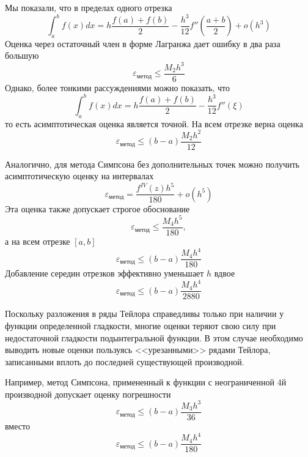 \documentclass[professionalfonts,compress,unicode]{beamer}
\begin{document}
{
	Мы показали, что в пределах одного отрезка 
	$$
	\int_a^b f(x) dx = h\frac{f(a)+f(b)}{2} - \frac{h^3}{12}f''\left(\frac{a+b}{2}\right) + o(h^3)
	$$
	Оценка через остаточный член в форме Лагранжа дает ошибку в два раза большую
	$$
	\varepsilon_{\text{метод}} \leq \frac{M_2 h^3}{6}
	$$
	Однако, более тонкими рассуждениями можно показать, что
	$$
	\int_a^b f(x) dx = h\frac{f(a)+f(b)}{2} - \frac{h^3}{12}f''(\xi)
	$$
	то есть асимптотическая оценка является точной.  На всем отрезке верна оценка
	$$
	\varepsilon_{\text{метод}} \leq (b-a) \frac{M_2 h^2}{12}
	$$	
}

{
	Аналогично, для метода Симпсона без дополнительных точек можно получить 
	асимптотическую оценку на интервалах
	$$
	\varepsilon_{\text{метод}} = \frac{f^{IV}(z) h^5}{180} + o(h^5)
	$$
	Эта оценка также допускает строгое обоснование
	$$
	\varepsilon_{\text{метод}} \leq \frac{M_4 h^5}{180},
	$$	
	а на всем отрезке $[a,b]$
	$$
	\varepsilon_{\text{метод}} \leq (b-a)\frac{M_4 h^4}{180}
	$$
	Добавление середин отрезков эффективно уменьшает $h$ вдвое
	$$
	\varepsilon_{\text{метод}} \leq (b-a)\frac{M_4 h^4}{2880}
	$$	
}

{
	Поскольку разложения в ряды Тейлора справедливы только
	при наличии у функции определенной гладкости, 
	многие оценки теряют свою силу при недостаточной гладкости
	подынтегральной функции. В этом случае необходимо выводить новые оценки пользуясь
	<<урезанными>> рядами Тейлора, записанными вплоть до последней существующей производной.
	
	Например, метод Симпсона, примененный к функции с неограниченной 4й производной допускает оценку погрешности
	$$
	\varepsilon_{\text{метод}} \leq (b-a)\frac{M_3 h^3}{36}
	$$ 
	вместо 
	$$
	\varepsilon_{\text{метод}} \leq (b-a)\frac{M_4 h^4}{180}
	$$
}
\end{document}
